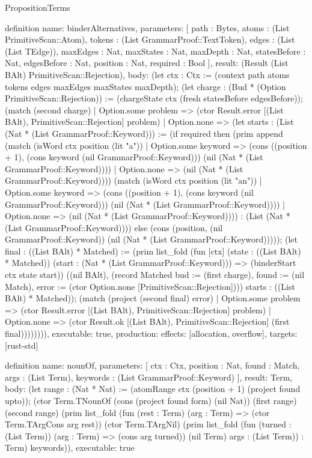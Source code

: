 \begin{lexlean}{PropositionTerms}
\begin{semanticmodule}
definition{
  name: binderAlternatives,
  parameters: [
    path : Bytes,
    atoms : (List PrimitiveScan::Atom),
    tokens : (List GrammarProof::TextToken),
    edges : (List (List TEdge)),
    maxEdges : Nat,
    maxStates : Nat,
    maxDepth : Nat,
    statesBefore : Nat,
    edgesBefore : Nat,
    position : Nat,
    required : Bool
  ],
  result: (Result (List BAlt) PrimitiveScan::Rejection),
  body: (let ctx : Ctx := (context path atoms tokens edges maxEdges maxStates maxDepth); (let charge : (Bud * (Option PrimitiveScan::Rejection)) := (chargeState ctx (fresh statesBefore edgesBefore)); (match (second charge)
    | Option.some problem => (ctor Result.error [(List BAlt), PrimitiveScan::Rejection] problem)
    | Option.none => (let starts : (List (Nat * (List GrammarProof::Keyword))) := (if required then (prim append (match (isWord ctx position (lit "a"))
      | Option.some keyword => (cons ((position + 1), (cons keyword (nil GrammarProof::Keyword))) (nil (Nat * (List GrammarProof::Keyword))))
      | Option.none => (nil (Nat * (List GrammarProof::Keyword)))) (match (isWord ctx position (lit "an"))
      | Option.some keyword => (cons ((position + 1), (cons keyword (nil GrammarProof::Keyword))) (nil (Nat * (List GrammarProof::Keyword))))
      | Option.none => (nil (Nat * (List GrammarProof::Keyword)))) : (List (Nat * (List GrammarProof::Keyword)))) else (cons (position, (nil GrammarProof::Keyword)) (nil (Nat * (List GrammarProof::Keyword))))); (let final : ((List BAlt) * Matched) := (prim list_fold (fun [ctx] (state : ((List BAlt) * Matched)) (start : (Nat * (List GrammarProof::Keyword))) => (binderStart ctx state start)) ((nil BAlt), (record Matched {bud := (first charge), found := (nil Match), error := (ctor Option.none [PrimitiveScan::Rejection])})) starts : ((List BAlt) * Matched)); (match (project (second final) error)
      | Option.some problem => (ctor Result.error [(List BAlt), PrimitiveScan::Rejection] problem)
      | Option.none => (ctor Result.ok [(List BAlt), PrimitiveScan::Rejection] (first final)))))))),
  executable: true,
  production: {effects: [allocation, overflow], targets: [rust-std]}
}

definition{
  name: nounOf,
  parameters: [
    ctx : Ctx,
    position : Nat,
    found : Match,
    args : (List Term),
    keywords : (List GrammarProof::Keyword)
  ],
  result: Term,
  body: (let range : (Nat * Nat) := (atomRange ctx (position + 1) (project found upto)); (ctor Term.TNounOf (cons (project found form) (nil Nat)) (first range) (second range) (prim list_fold (fun (rest : Term) (arg : Term) => (ctor Term.TArgCons arg rest)) (ctor Term.TArgNil) (prim list_fold (fun (turned : (List Term)) (arg : Term) => (cons arg turned)) (nil Term) args : (List Term)) : Term) keywords)),
  executable: true
}


\end{semanticmodule}
\end{lexlean}
